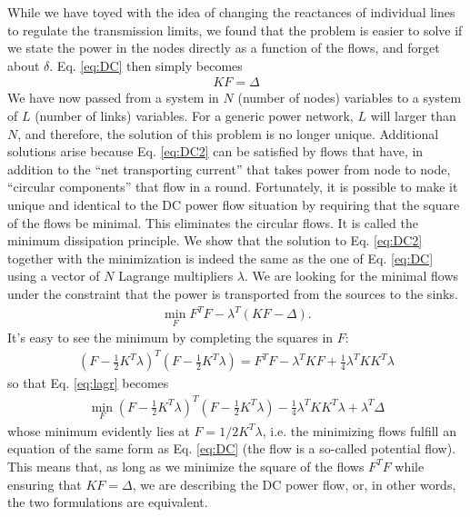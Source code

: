\documentclass[english,twoside,a4paper,11pt]{article}
\numberwithin{equation}{section}
\begin{document}
While we have toyed with the idea of changing the reactances of
individual lines to regulate the transmission limits, we found that
the problem is easier to solve if we state the power in the nodes
directly as a function of the flows, and forget about
$\delta$. Eq. \eqref{eq:DC} then simply becomes
\begin{align}
KF= \Delta
\label{eq:DC2}
\end{align}
We have now passed from a system in $N$ (number of nodes) variables to
a system of $L$ (number of links) variables. For a generic power
network, $L$ will larger than $N$, and therefore, the solution of this
problem is no longer unique. Additional solutions arise because
Eq. \eqref{eq:DC2} can be satisfied by flows that have, in addition to
the ``net transporting current'' that takes power from node to node,
``circular components'' that flow in a round. Fortunately, it is
possible to make it unique and identical to the DC power flow
situation by requiring that the square of the flows be minimal. This
eliminates the circular flows. It is called the minimum dissipation
principle. We show that the solution
to Eq. \eqref{eq:DC2} together with the minimization is indeed the
same as the one of Eq. \eqref{eq:DC} using a vector of $N$ Lagrange
multipliers $\lambda$. We are looking for the minimal flows under the
constraint that the power is transported from the sources to the sinks.
\begin{align}
\min_F F^T F -\lambda^T (KF-\Delta).
\label{eq:lagr}
\end{align}
It's easy to see the minimum by completing the squares in $F:$
\begin{align*}
\left(F- \frac{1}{2}K^T \lambda\right)^T 
\left(F- \frac{1}{2}K^T \lambda\right)
=F^T F-\lambda^T KF+ \frac{1}{4}\lambda^T K K^T \lambda
\end{align*}
so that Eq. \eqref{eq:lagr} becomes
\begin{align*}
\min_F
\left(F- \frac{1}{2}K^T \lambda\right)^T 
\left(F- \frac{1}{2}K^T \lambda\right)-
\frac{1}{4}\lambda^T K K^T \lambda  +\lambda^T \Delta
\end{align*}
whose minimum evidently lies at $F=1/2 K^T \lambda$, i.e.
the minimizing flows fulfill an equation of the same form as
Eq. \eqref{eq:DC} (the flow is a so-called potential flow). This means
that, as long as we minimize the square 
of the flows $F^T F$ while ensuring that $KF= \Delta$, we are describing
the DC power flow, or, in other words, the two formulations are
equivalent.
\end{document}
